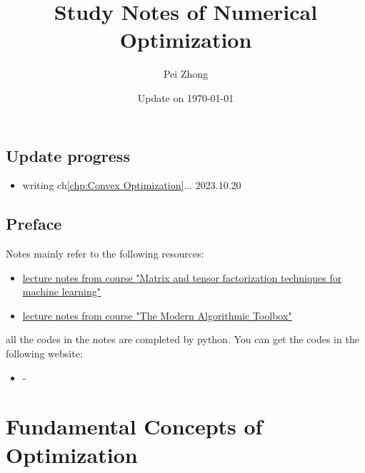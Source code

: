 \documentclass[12pt,oneside]{book} %
\begin{document}
\title{\bf \huge Study Notes of Numerical Optimization}
\author{Pei Zhong}
\date{Update on \today}

\maketitle


\tableofcontents

\begin{spacing}{1}

\chapter*{Update progress}
\begin{itemize}
    \item {writing ch\ref{chp:Convex Optimization}... \hfill 2023.10.20}
\end{itemize}






\chapter*{Preface}


Notes mainly refer to the following resources:
\begin{itemize}
    \item \href{https://www-labs.iro.umontreal.ca/~grabus/courses/ift6760a-w20.html}{lecture notes from course "Matrix and tensor factorization techniques for machine learning"}
    \item \href{https://web.stanford.edu/class/cs168/}{lecture notes from course "The Modern Algorithmic Toolbox"}
\end{itemize}

\par

all the codes in the notes are completed by python. You can get the codes in the following website:
\begin{itemize}
    \item -
\end{itemize}



\part{Fundamental Concepts of Optimization}

\end{spacing}
\end{document}
